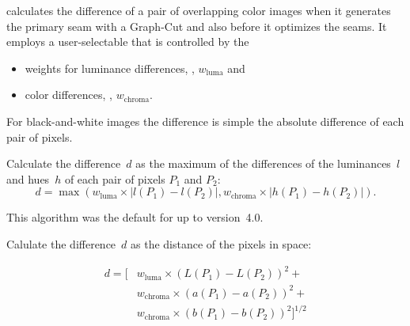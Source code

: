 \begin{codelist}
  \App{} calculates the difference of a pair of overlapping color images when it generates the
  primary seam with a Graph-Cut and also before it optimizes the seams.  It employs a
  user-selectable  that is controlled by the

  \begin{itemize}
  \item
    weights for luminance differences, ,
    $w_{\mathrm{luma}}$ and

  \item
    color differences, , $w_{\mathrm{chroma}}$.
  \end{itemize}

  For black-and-white images the difference is simple the absolute difference of each pair of
  pixels.

  \begin{codelist}
  \item[\itempar{maximum-hue-luminance \\ maximum-hue-lum
      \\ max-hue-luminance \\ max-hue-lum \\ max}]\itemend Calculate
    the difference~$d$ as the maximum of
    the differences of the luminances~$l$ and hues~$h$ of each pair
    of pixels $P_1$ and $P_2$:
    \[
    d  = \max\left(w_{\mathrm{luma}} \times |l(P_1) - l(P_2)|,
    w_{\mathrm{chroma}} \times |h(P_1) - h(P_2)|\right).
    \]

    This algorithm was the default for \App{} up to version~4.0.

  \item[\itempar{delta-e \\ de}]\itemend
    Calulate the difference~$d$ as the  distance of the pixels in
     space:

    \begin{align*}
      d = \Big[ & w_{\mathrm{luma}} \times \left(L(P_1) - L(P_2)\right)^2 + \\
                & w_{\mathrm{chroma}} \times \left(a(P_1) - a(P_2)\right)^2 + \\
                & w_{\mathrm{chroma}} \times \left(b(P_1) - b(P_2)\right)^2
        \Big]^{1/2}
    \end{align*}


\end{codelist}
\end{codelist}
